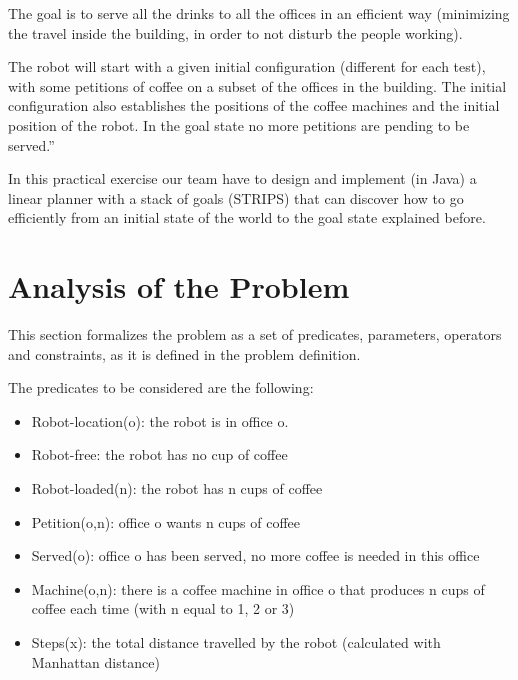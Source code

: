 \documentclass[12pt,a4paper,oneside]{article}
\numberwithin{equation}{section}
\numberwithin{equation}{section}
\theoremstyle{definition}
\begin{document}
The goal is to serve all the drinks to all the offices in an efficient way (minimizing the travel inside the building, in order to not disturb the people working).


The robot will start with a given initial configuration (different for each test), with some petitions of coffee on a subset of the offices in the building. The initial configuration also establishes the positions of the coffee machines and the initial position of the robot. In the goal state no more petitions are pending to be served.”


In this practical exercise our team have to design and implement (in Java) a linear planner with a stack of goals (STRIPS) that can discover how to go efficiently from an initial state of the world to the goal state explained before.


\newpage

\section{Analysis of the Problem} \label{Analysis of the Problem}

This section formalizes the problem as a set of predicates, parameters, operators and constraints, as it is defined in the problem definition\cite{problemdefinition}.


The predicates to be considered are the following:
\begin{itemize}
	\item Robot-location(o): the robot is in office o.
	\item Robot-free: the robot has no cup of coffee
	\item Robot-loaded(n): the robot has n cups of coffee
	\item Petition(o,n): office o wants n cups of coffee
	\item Served(o): office o has been served, no more coffee is needed in this office
	\item Machine(o,n): there is a coffee machine in office o that produces n cups of coffee each time (with n equal to 1, 2 or 3)
	\item Steps(x): the total distance travelled by the robot (calculated with Manhattan distance)
\end{itemize}
\end{document}
